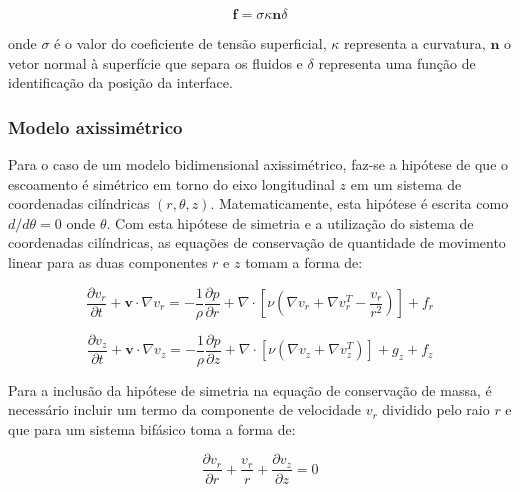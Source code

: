 \documentclass[a4paper,portuges,12pt]{article}
\newcommand{\vvet}{\mathbf{v}}
\newcommand{\nvet}{\mathbf{n}}
\begin{document}
\begin{equation}
	\mathbf{f} = \sigma \kappa \nvet \delta 
\label{eq:brackbill}
\end{equation}\vspace{0.5cm}

\noindent onde $\sigma$ é o valor do coeficiente de tensão superficial,
$\kappa$ representa a curvatura, $\nvet$ o vetor normal à superfície que
separa os fluidos e $\delta$ representa uma função de identificação da
posição da interface.

\subsubsection{Modelo axissimétrico}

Para o caso de um modelo bidimensional axissimétrico, faz-se a hipótese
de que o escoamento é simétrico em torno do eixo longitudinal $z$ em um
sistema de coordenadas cilíndricas $(r,\theta,z)$. Matematicamente, esta
hipótese é escrita como $d/d\theta=0$ onde $\theta$. Com esta hipótese
de simetria e a utilização do sistema de coordenadas cilíndricas, as
equações de conservação de quantidade de movimento linear para as duas
componentes $r$ e $z$ tomam a forma de:

\begin{equation}
	\frac{\partial v_r}{\partial t} + \vvet \cdot \nabla v_r
	= 
	- \frac{1}{\rho} \frac{\partial p}{\partial r} +
	\nabla \cdot [\nu(\nabla v_r + \nabla v_r^T - \frac{v_r}{r^2})] 
	+ 
	f_r
\label{eq:NSAxi1}
\end{equation}

\begin{equation}
	\frac{\partial v_z}{\partial t} + \vvet \cdot \nabla v_z
	= 
	- \frac{1}{\rho} \frac{\partial p}{\partial z} +
	\nabla \cdot [\nu(\nabla v_z + \nabla v_z^T)] + 
	g_z 
	+ 
	f_z
\label{eq:NSAxi}
\end{equation}\vspace{0.5cm}

Para a inclusão da hipótese de simetria na equação de conservação de
massa, é necessário incluir um termo da componente de velocidade $v_r$
dividido pelo raio $r$ e que para um sistema bifásico toma a forma de:

\begin{equation}
	\frac{\partial v_r}{\partial r}
	+
	\frac{v_r}{r}
	+
	\frac{\partial v_z}{\partial z}  
	= 
	0
	\label{eq:cm9-axi}
\end{equation}\vspace{0.5cm}
\end{document}
